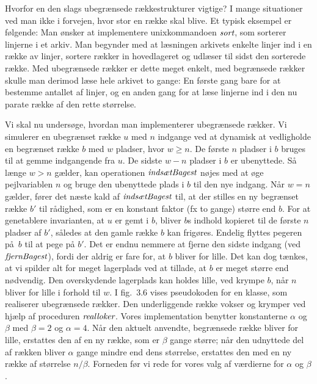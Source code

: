 Hvorfor en den slags ubegrænsede rækkestrukturer vigtige?
I mange situationer ved man ikke i forvejen, hvor stor en række skal blive.
Et typisk eksempel er følgende:
Man ønsker at implementere unixkommandoen $\operatorname{\emph{sort}}$, som sorterer linjerne i et arkiv.
Man begynder med at læsningen arkivets enkelte linjer ind i en række av linjer, sortere rækker in hovedlageret og udlæser til sidst den sorterede række.
Med ubegrænsede rækker er dette meget enkelt, med begrænsede rækker skulle man derimod læse hele arkivet to gange:
En første gang bare for at bestemme antallet af linjer, og en anden gang for at læse linjerne ind i den nu parate række af den rette størrelse.

Vi skal nu undersøge, hvordan man implementerer ubegrænsede rækker.
Vi simulerer en ubegrænset række $u$ med $n$ indgange ved at dynamisk at vedligholde en begrænset række $b$ med $w$ pladser, hvor $w\geq n$.
De første $n$ pladser i $b$ bruges til at gemme indgangende fra $u$.
De sidste $w-n$ pladser i $b$ er ubenyttede.
Så længe $w>n$ gælder, kan operationen $\operatorname{\emph{indsætBagest}}$ nøjes med at øge pejlvariablen $n$ og bruge den ubenyttede plads i $b$ til den nye indgang.
Når $w=n$ gælder, fører det næste kald af $\operatorname{\emph{indsætBagest}}$ til, at der stilles en ny begrænset række $b'$ til rådighed, som er en konstant faktor (fx to gange) større end $b$.
For at genetablere invarianten, at $u$ er gemt i $b$, bliver $b$s indhold kopieret til de første $n$ pladser af $b'$, således at den gamle række $b$ kan frigøres.
Endelig flyttes pegeren på $b$ til at pege på $b'$.
Det er endnu nemmere at fjerne den sidste indgang (ved $\operatorname{\emph{fjernBagest}}$), fordi der aldrig er fare for, at $b$ bliver for lille.
Det kan dog tænkes, at vi spilder alt for meget lagerplads ved at tillade, at $b$ er meget større end nødvendig.
Den overskydende lagerplads kan holdes lille, ved krympe $b$, når $n$ bliver for lille i forhold til $w$.
I fig.~3.6 vises pseudokoden for en klasse, som realiserer ubegrænsede rækker.
Den underliggende række vokser og krymper ved hjælp af proceduren $\operatorname{\emph{realloker}}$.
Vores implementation benytter konstanterne $\alpha$ og $\beta$ med $\beta= 2$ og $\alpha=4$.
Når den aktuelt anvendte, begrænsede række bliver for lille, erstattes den af en ny række, som er $\beta$ gange større;
når den udnyttede del af rækken bliver $\alpha$ gange mindre end dens størrelse, erstattes den med en ny række af størrelse $n/\beta$.
Forneden før vi rede for vores valg af værdierne for $\alpha$ og $\beta$.

